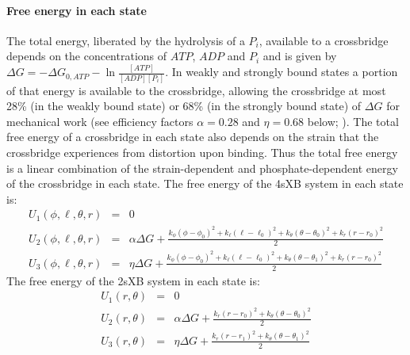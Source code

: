 \documentclass[]{article}
\begin{document}
\paragraph{Free energy in each state} %
The total energy, liberated by the hydrolysis of a $P_i$, available to a crossbridge depends on the concentrations of $ATP$, $ADP$ and $P_i$ and is given by $\Delta G = -\Delta G_{0,ATP} - \ln \frac{[ATP]}{[ADP] [P_i]}$. 
In weakly and strongly bound states a portion of that energy is available to the crossbridge, allowing the crossbridge at most 28\% (in the weakly bound state) or 68\% (in the strongly bound state) of $\Delta G$ for mechanical work (see efficiency factors $\alpha=0.28$ and $\eta=0.68$ below; \citet{Pate1989, Tanner:2007:pe115}).
The total free energy of a crossbridge in each state also depends on the strain that the crossbridge experiences from distortion upon binding.
Thus the total free energy is a linear combination of the strain-dependent and phosphate-dependent energy of the crossbridge in each state.
The free energy of the 4sXB system in each state is: 
\begin{eqnarray}
\label{4sEnergy}
U_1(\phi,\ell,\theta,r) & = & 0 \nonumber \\
U_2(\phi,\ell,\theta,r) & = & \alpha \Delta G + \frac{k_\phi (\phi-\phi_0)^2 + k_\ell (\ell-\ell_0)^2 + k_\theta (\theta-\theta_0)^2 + k_r (r-r_0)^2}{2} \nonumber \\
U_3(\phi,\ell,\theta,r) & = & \eta \Delta G + \frac{k_\phi (\phi-\phi_0)^2 + k_\ell (\ell-\ell_0)^2 + k_\theta (\theta-\theta_1)^2 + k_r (r-r_0)^2}{2} \nonumber
\end{eqnarray}
The free energy of the 2sXB system in each state is: 
\begin{eqnarray}
\label{2sEnergy}
	U_1(r,\theta) & = & 0 \nonumber \\
    U_2(r,\theta) & = & \alpha \Delta G + \frac{k_r (r - r_0)^2 + 
                        k_\theta (\theta - \theta_0)^2}{2} \nonumber \\
    U_3(r,\theta) & = & \eta \Delta G   + \frac{k_r (r - r_1)^2 + 
                        k_\theta (\theta - \theta_1)^2}{2} \nonumber
\end{eqnarray}
\end{document}
